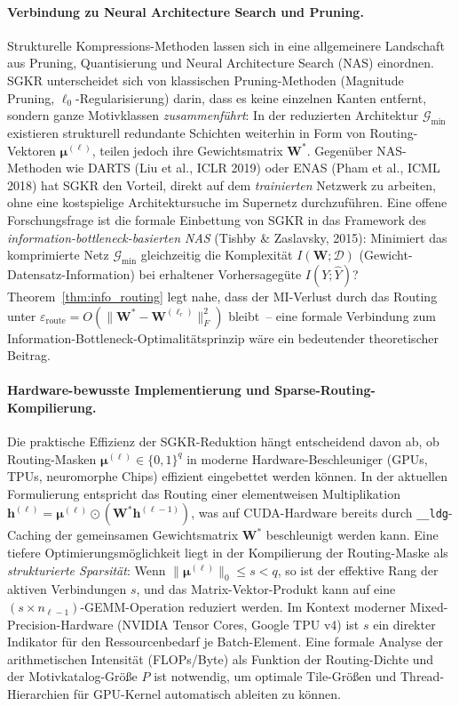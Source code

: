 \documentclass[12pt, a4paper, openany]{report}
\newcommand{\calG}{\mathcal{G}}
\newcommand{\calD}{\mathcal{D}}
\begin{document}
\paragraph{Verbindung zu Neural Architecture Search und Pruning.}
Strukturelle Kompres\-sions-Methoden lassen sich in eine allgemeinere Landschaft
aus Pruning, Quantisierung und Neural Architecture Search (NAS) einordnen.
SGKR unterscheidet sich von klassischen Pruning-Methoden (Magnitude Pruning,
$\ell_0$-Regularisierung) darin, dass es keine einzelnen Kanten entfernt,
sondern ganze Motivklassen \emph{zusammenführt}: In der reduzierten
Architektur $\calG_{\min}$ existieren strukturell redundante Schichten
weiterhin in Form von Routing-Vektoren $\bm{\mu}^{(\ell)}$, teilen jedoch
ihre Gewichtsmatrix $\bm{W}^*$.  Gegenüber NAS-Methoden wie DARTS
(Liu et al., ICLR 2019) oder ENAS (Pham et al., ICML 2018) hat SGKR den
Vorteil, direkt auf dem \emph{trainierten} Netzwerk zu arbeiten, ohne eine
kostspielige Architektursuche im Supernetz durchzuführen.  Eine offene
Forschungsfrage ist die formale Einbettung von SGKR in das Framework des
\emph{information-bottleneck-basierten NAS} (Tishby \& Zaslavsky, 2015):
Minimiert das komprimierte Netz $\calG_{\min}$ gleichzeitig die
Komplexität $I(\bm{W};\calD)$ (Gewicht-Datensatz-Information) bei erhaltener
Vorhersagegüte $I(Y;\hat{Y})$?  Theorem~\ref{thm:info_routing} legt nahe,
dass der MI-Verlust durch das Routing unter
$\varepsilon_{\mathrm{route}} = O(\|\bm{W}^* - \bm{W}^{(\ell_r)}\|_F^2)$
bleibt~-- eine formale Verbindung zum Information-Bottleneck-Optimalitätsprinzip
wäre ein bedeutender theoretischer Beitrag.

\paragraph{Hardware-bewusste Implementierung und Sparse-Routing-Kompilierung.}
Die praktische Effizienz der SGKR-Reduktion hängt entscheidend davon ab,
ob Routing-Masken $\bm{\mu}^{(\ell)} \in \{0,1\}^q$ in moderne Hardware-Beschleuniger
(GPUs, TPUs, neuromorphe Chips) effizient eingebettet werden können.  In der
aktuellen Formulierung entspricht das Routing einer elementweisen
Multiplikation $\bm{h}^{(\ell)} = \bm{\mu}^{(\ell)} \odot (\bm{W}^*
\bm{h}^{(\ell-1)})$, was auf CUDA-Hardware bereits durch
\texttt{\_\_ldg}-Caching der gemeinsamen Gewichtsmatrix $\bm{W}^*$
beschleunigt werden kann.  Eine tiefere Optimierungsmöglichkeit liegt in
der Kompilierung der Routing-Maske als \emph{strukturierte Sparsität}: Wenn
$\|\bm{\mu}^{(\ell)}\|_0 \leq s < q$, so ist der effektive Rang der aktiven
Verbindungen $s$, und das Matrix-Vektor-Produkt kann auf eine
$(s \times n_{\ell-1})$-GEMM-Operation reduziert werden.  Im Kontext moderner
Mixed-Precision-Hardware (NVIDIA Tensor Cores, Google TPU v4) ist $s$ ein
direkter Indikator für den Ressourcenbedarf je Batch-Element.  Eine formale
Analyse der arithmetischen Intensität (FLOPs/Byte) als Funktion der
Routing-Dichte und der Motivkatalog-Größe $P$ ist notwendig, um optimale
Tile-Größen und Thread-Hierarchien für GPU-Kernel automatisch ableiten zu
können.
\end{document}
